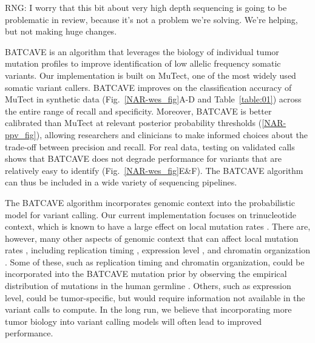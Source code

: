 \documentclass[a4,center,fleqn]{NAR}
\newcommand{\rngcomment}[1]{{\color{red}RNG: #1}}
\newcommand{\batcave}{BATCAVE\xspace}
\begin{document}
\rngcomment{I worry that this bit about very high depth sequencing is going to be problematic in review, because it's not a problem we're solving. We're helping, but not making huge changes.}

\batcave is an algorithm that leverages the biology of individual tumor mutation profiles to improve identification of low allelic frequency somatic variants.
Our implementation is built on MuTect, one of the most widely used somatic variant callers.
\batcave improves on the classification accuracy of MuTect in synthetic data (Fig.~\ref{NAR-wes_fig}A-D and Table~\ref{table:01}) across the entire range of recall and specificity.
Moreover, \batcave is better calibrated than MuTect at relevant posterior probability thresholds (\ref{NAR-ppv_fig}), allowing researchers and clinicians to make informed choices about the trade-off between precision and recall.
For real data, testing on validated calls shows that \batcave does not degrade performance for variants that are relatively easy to identify (Fig.~\ref{NAR-wes_fig}E\&F).
The \batcave algorithm can thus be included in a wide variety of sequencing pipelines.

The \batcave algorithm incorporates genomic context into the probabilistic model for variant calling.
Our current implementation focuses on trinucleotide context, which is known to have a large effect on local mutation rates \cite{Martincorena2015,Hollstein2017}.
There are, however, many other aspects of genomic context that can affect local mutation rates \citep{Buisson2019}, including replication timing \citep{Stamatoyannopoulos2009}, expression level \citep{Pleasance2010}, and chromatin organization \citep{Schuster-Bockler2012}. 
Some of these, such as replication timing and chromatin organization, could be incorporated into the \batcave mutation prior by observing the empirical distribution of mutations in the human germline \cite{Hodgkinson2011}.
Others, such as expression level, could be tumor-specific, but would require information not available in the variant calls to compute.
In the long run, we believe that incorporating more tumor biology into variant calling models will often lead to improved performance.
\end{document}
